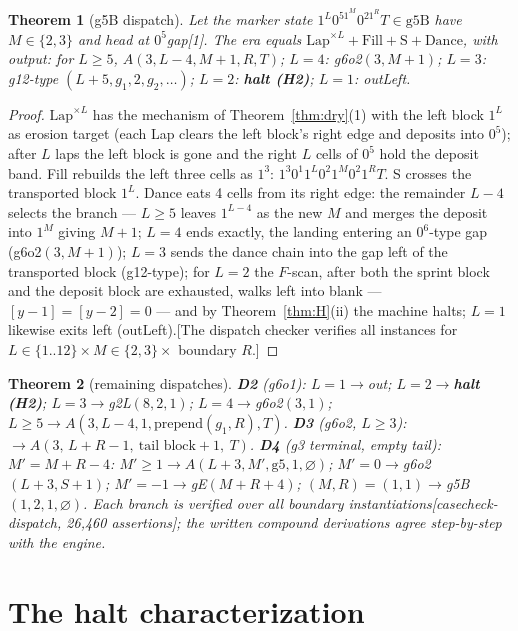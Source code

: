 \documentclass[11pt]{amsart}
\newtheorem{theorem}{Theorem}[section]
\begin{document}
\begin{theorem}[g5B dispatch]\label{thm:D1}
Let the marker state $1^L0^51^M0^21^RT\in\mathrm{g5B}$ have $M\in\{2,3\}$ and head at $0^5$gap[1]. The era equals $\mathrm{Lap}^{\times L}+\mathrm{Fill}+\mathrm S+\mathrm{Dance}$, with output: for $L\ge5$, $A(3,L{-}4,M{+}1,R,T)$; $L=4$: g6o2$(3,M{+}1)$; $L=3$: g12-type $(L{+}5,g_1,2,g_2,\dots)$; $L=2$: \textbf{halt (H2)}; $L=1$: outLeft.
\end{theorem}
\begin{proof}
$\mathrm{Lap}^{\times L}$ has the mechanism of Theorem~\ref{thm:dry}(1) with the left block $1^L$ as erosion target (each Lap clears the left block's right edge and deposits into $0^5$); after $L$ laps the left block is gone and the right $L$ cells of $0^5$ hold the deposit band. Fill rebuilds the left three cells as $1^3$: $1^3 0^1 1^L 0^2 1^M 0^2 1^RT$. S crosses the transported block $1^L$. Dance eats 4 cells from its right edge: the remainder $L-4$ selects the branch --- $L\ge5$ leaves $1^{L-4}$ as the new $M$ and merges the deposit into $1^M$ giving $M{+}1$; $L=4$ ends exactly, the landing entering an $0^6$-type gap (g6o2$(3,M{+}1)$); $L=3$ sends the dance chain into the gap left of the transported block (g12-type); for $L=2$ the $F$-scan, after both the sprint block and the deposit block are exhausted, walks left into blank --- $[y{-}1]=[y{-}2]=0$ --- and by Theorem~\ref{thm:H}(ii) the machine halts; $L=1$ likewise exits left (outLeft).[The dispatch checker verifies all instances for $L\in\{1..12\}\times M\in\{2,3\}\times$ boundary $R$.]
\end{proof}

\begin{theorem}[remaining dispatches]\label{thm:dispatch}
\textbf{D2} (g6o1): $L=1\to$out; $L=2\to$\textbf{halt (H2)}; $L=3\to$g2L$(8,2,1)$; $L=4\to$g6o2$(3,1)$; $L\ge5\to A(3,L{-}4,1,\text{prepend}(g_1,R),T)$.
\textbf{D3} (g6o2, $L\ge3$): $\to A(3,\,L{+}R{-}1,\ \text{tail block}{+}1,\ T)$.
\textbf{D4} (g3 terminal, empty tail): $M'=M{+}R{-}4$: $M'\ge1\to A(L{+}3,M',\mathrm{g5},1,\varnothing)$; $M'=0\to$g6o2$(L{+}3,S{+}1)$; $M'=-1\to$gE$(M{+}R{+}4)$; $(M,R)=(1,1)\to$g5B$(1,2,1,\varnothing)$.
Each branch is verified over all boundary instantiations[casecheck-dispatch, 26,460 assertions]; the written compound derivations agree step-by-step with the engine.
\end{theorem}

\section{The halt characterization}
\end{document}
